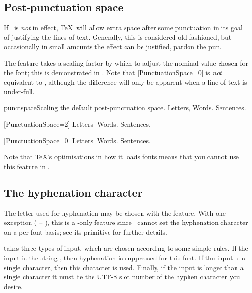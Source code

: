\subsection{Post-punctuation space}

If \cmd\frenchspacing\ is \emph{not} in effect, \TeX\ will allow extra
space after some punctuation in its goal of justifying the lines of text.
Generally, this is considered old-fashioned, but occasionally in small amounts the
effect can be justified, pardon the pun.

The  feature takes a scaling factor by which to
adjust the nominal value chosen for the font; this is demonstrated in
.
Note that |PunctuationSpace=0|
is \emph{not} equivalent to \cmd\frenchspacing, although the difference
will only be apparent when a line of text is under-full.

\begin{Lexample}{punctspace}{Scaling the default post-punctuation space.}
  \nonfrenchspacing
   Letters, Words. Sentences.          \par
  [PunctuationSpace=2]
   Letters, Words. Sentences.          \par
  [PunctuationSpace=0]
   Letters, Words. Sentences.
\end{Lexample}

Note that \TeX's optimisations in how it loads fonts means that you cannot
use this feature in .



\subsection{The hyphenation character}

The letter used for hyphenation may be chosen with the 
feature.
With one exception ( \texttt{=} ),
this is a \XeTeX-only feature since \LuaTeX\ cannot set the hyphenation character on a per-font basis;
see its  primitive for further details.

 takes three types of input, which are chosen according to some
simple rules. If the input is the string , then hyphenation is
suppressed for this font.
If the input is a single character, then this character is used.
Finally, if the input is longer than a single character
it must be the UTF-8 slot number of the hyphen character you desire.

